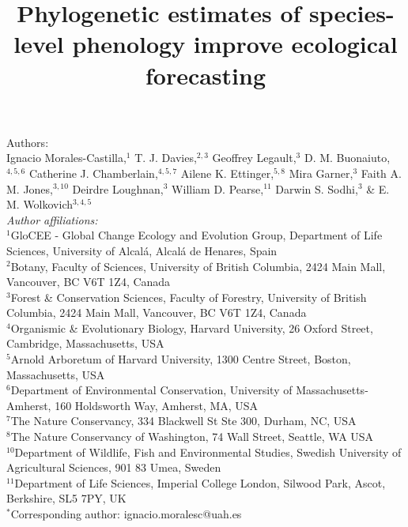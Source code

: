 \documentclass[11pt]{article}
\title{Phylogenetic estimates of species-level phenology improve ecological forecasting}
\def\labelitemi{--}
\begin{document}


\author{}
\maketitle

\noindent Authors:\\
Ignacio Morales-Castilla,$^{1}$ T. J. Davies,$^{2,3}$ Geoffrey Legault,$^{3}$ D. M. Buonaiuto,$^{4,5,6}$ Catherine J. Chamberlain,$^{4,5,7}$ Ailene K. Ettinger,$^{5,8}$ Mira Garner,$^{3}$ Faith A. M. Jones,$^{3,10}$ Deirdre Loughnan,$^{3}$ William D. Pearse,$^{11}$ Darwin S. Sodhi,$^{3}$ \& E. M. Wolkovich$^{3,4,5}$  \vspace{2ex}\\
\emph{Author affiliations:}\\
$^{1}$GloCEE - Global Change Ecology and Evolution Group, Department of Life Sciences, University of Alcal\'a, Alcal\'a de Henares, Spain\\ %
 $^{2}$Botany, Faculty of Sciences, University of British Columbia, 2424 Main Mall, Vancouver, BC V6T 1Z4, Canada\\
$^{3}$Forest \& Conservation Sciences, Faculty of Forestry, University of British Columbia, 2424 Main Mall, Vancouver, BC V6T 1Z4, Canada\\
$^{4}$Organismic \& Evolutionary Biology, Harvard University, 26 Oxford Street, Cambridge, Massachusetts, USA\\
$^{5}$Arnold Arboretum of Harvard University, 1300 Centre Street, Boston, Massachusetts, USA\\
$^{6}$Department of Environmental Conservation, University of Massachusetts-Amherst, 160 Holdsworth Way, Amherst, MA, USA\\  %
 $^{7}$The Nature Conservancy, 334 Blackwell St Ste 300, Durham, NC, USA \\ %
$^{8}$The Nature Conservancy of Washington, 74 Wall Street, Seattle, WA  USA \\ %
$^{10}$Department of Wildlife, Fish and Environmental Studies, Swedish University of Agricultural Sciences, 901 83 Umea, Sweden\\ %
$^{11}$Department of Life Sciences, Imperial College London, Silwood Park, Ascot, Berkshire, SL5 7PY, UK\\

\vspace{2ex}
$^*$Corresponding author: ignacio.moralesc@uah.es\\
\renewcommand{\thetable}{\arabic{table}}
\renewcommand{\thefigure}{\arabic{figure}}
\renewcommand{\labelitemi}{$-$}
\end{document}
